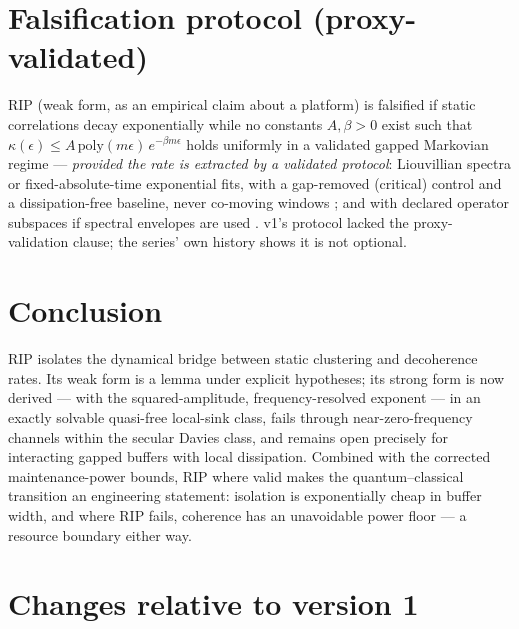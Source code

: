 \documentclass[11pt,a4paper]{article}
\theoremstyle{plain}
\theoremstyle{definition}
\theoremstyle{remark}
\newcommand{\eps}{\epsilon}
\begin{document}
\section{Falsification protocol (proxy-validated)}

RIP (weak form, as an empirical claim about a platform) is falsified if
static correlations decay exponentially while no constants $A, \beta > 0$
exist such that $\kappa(\eps) \le A\,\mathrm{poly}(m\eps)\,e^{-\beta m\eps}$
holds uniformly in a validated gapped Markovian regime --- \emph{provided the
rate is extracted by a validated protocol}: Liouvillian spectra or
fixed-absolute-time exponential fits, with a gap-removed (critical) control
and a dissipation-free baseline, never co-moving windows
\cite{HCut}; and with declared operator subspaces if spectral envelopes are
used \cite{Stress}. v1's protocol lacked the proxy-validation clause; the
series' own history shows it is not optional.

\section{Conclusion}

RIP isolates the dynamical bridge between static clustering and decoherence
rates. Its weak form is a lemma under explicit hypotheses; its strong form is
now derived --- with the squared-amplitude, frequency-resolved exponent ---
in an exactly solvable quasi-free local-sink class, fails through
near-zero-frequency channels within the secular Davies class, and remains
open precisely for interacting gapped buffers with local dissipation.
Combined with the corrected maintenance-power bounds, RIP where valid makes
the quantum--classical transition an engineering statement: isolation is
exponentially cheap in buffer width, and where RIP fails, coherence has an
unavoidable power floor --- a resource boundary either way.

\appendix

\section{Changes relative to version 1}
\end{document}
